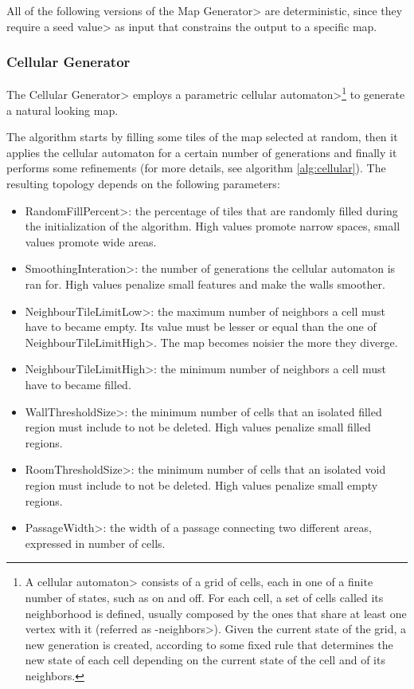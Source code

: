 All of the following versions of the \<Map Generator> are deterministic, since they require a \<seed value> as input that constrains the output to a specific map.


\subsubsection{Cellular Generator}

The \<Cellular Generator> employs a parametric \<cellular automaton>\footnote{A \<cellular automaton> consists of a grid of cells, each in one of a finite number of states, such as on and off. For each cell, a set of cells called its neighborhood is defined, usually composed by the ones that share at least one vertex with it (referred as -neighbors>). Given the current state of the grid, a new generation is created, according to some fixed rule that determines the new state of each cell depending on the current state of the cell and of its neighbors.} to generate a natural looking map. 

\par

The algorithm starts by filling some tiles of the map selected at random, then it applies the cellular automaton for a certain number of generations and finally it performs some refinements (for more details, see algorithm \ref{alg:cellular}). The resulting topology depends on the following parameters:

\begin{itemize}
\item \<RandomFillPercent>: the percentage of tiles that are randomly filled during the initialization of the algorithm. High values promote narrow spaces, small values promote wide areas.
\item \<SmoothingInteration>: the number of generations the cellular automaton is ran for. High values penalize small features and make the walls smoother. 
\item \<NeighbourTileLimitLow>: the maximum number of neighbors a cell must have to became empty. Its value must be lesser or equal than the one of \<NeighbourTileLimitHigh>. The map becomes noisier the more they diverge.
\item \<NeighbourTileLimitHigh>: the minimum number of neighbors a cell must have to became filled.
\item \<WallThresholdSize>: the minimum number of cells that an isolated filled region must include to not be deleted. High values penalize small filled regions.
\item \<RoomThresholdSize>: the minimum number of cells that an isolated void region must include to not be deleted. High values penalize small empty regions.
\item \<PassageWidth>: the width of a passage connecting two different areas, expressed in number of cells.
\end{itemize}

